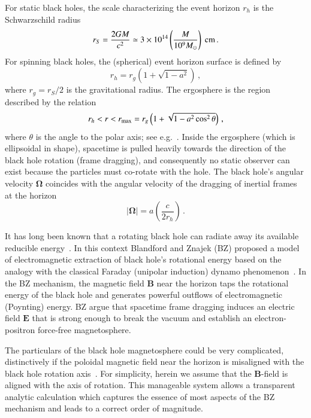 \documentclass[aps,prd,twocolumn,superscriptaddress,tightenlines,nofootinbib]{revtex4-1}
\begin{document}
For static black holes, the scale characterizing
the event horizon $r_h$ is the Schwarzschild
radius
\begin{equation}
r_S = \frac{2GM}{c^2} \simeq 3 \times 10^{14} \left(\frac{M}{10^9
    M_\odot} \right)~{\rm cm} \, .
\end{equation}
For spinning black holes, the (spherical) event horizon surface is
defined by
\begin{equation}
r_h = r_g \left(1 + \sqrt{1-a^2} \right) \,,
\end{equation}
where $r_g = r_S/2$ is the gravitational radius. The
ergosphere is the region described by the relation 
\begin{equation}
r_h < r < r_{\rm max} = r_g \left(1 + \sqrt{1-a^2 \cos^2 \theta} \right) \,,
\end{equation}
where $\theta$ is the angle to the polar axis; see
e.g.~\cite{Visser:2007fj,Rieger:2011ch}. Inside the ergosphere (which
is ellipsoidal in shape), spacetime is pulled heavily towards the
direction of the black hole rotation (frame dragging), and
consequently no static observer can exist because the particles must
co-rotate with the hole. The black hole's angular velocity
$\bm{\Omega}$ coincides with the angular velocity of the dragging of
inertial frames at the horizon~\cite{Rieger:2011ch}
\begin{equation}
|\bm{\Omega}| = a \left(\frac{c}{2 r_h} \right) \, .
\end{equation}

It has long been known that a rotating black hole can radiate away its
available reducible energy~\cite{Penrose:1969pc,Penrose:1971uk}. In
this context Blandford and Znajek (BZ) proposed a model of electromagnetic
extraction of black hole's rotational energy based on the analogy with
the classical Faraday  (unipolar induction) dynamo
phenomenon~\cite{Blandford:1977ds,Znajek}. In the BZ mechanism, the
magnetic field $\bm{B}$ near the horizon taps the rotational energy of the
black hole and generates powerful outflows of electromagnetic
(Poynting) energy. BZ argue that spacetime frame dragging induces an
electric field $\bm{E}$ that is strong enough to break the vacuum and
establish an electron-positron force-free magnetosphere.

The particulars of the black hole magnetosphere could be very
complicated, distinctively if the poloidal magnetic field near the
horizon is misaligned with the black hole rotation axis~\cite{Neronov:2007mh}.  For
simplicity, herein we assume that the $\bm{B}$-field is aligned with the
axis of rotation. This manageable system allows a transparent
analytic calculation which captures the essence of most aspects of the
BZ mechanism and leads to a correct order of magnitude.  
\end{document}
